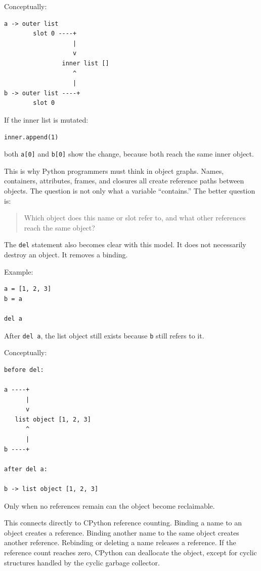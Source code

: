 Conceptually:

\begin{verbatim}
a -> outer list
        slot 0 ----+
                   |
                   v
                inner list []
                   ^
                   |
b -> outer list ----+
        slot 0
\end{verbatim}

If the inner list is mutated:

\begin{verbatim}
inner.append(1)
\end{verbatim}

both \texttt{a[0]} and \texttt{b[0]} show the change, because both reach the same inner object.

This is why Python programmers must think in object graphs. Names, containers, attributes, frames, and closures all create reference paths between objects. The question is not only what a variable ``contains.'' The better question is:

\begin{quote}
Which object does this name or slot refer to, and what other references reach the same object?
\end{quote}

The \texttt{del} statement also becomes clear with this model. It does not necessarily destroy an object. It removes a binding.

Example:

\begin{verbatim}
a = [1, 2, 3]
b = a

del a
\end{verbatim}

After \texttt{del a}, the list object still exists because \texttt{b} still refers to it.

Conceptually:

\begin{verbatim}
before del:

a ----+
      |
      v
   list object [1, 2, 3]
      ^
      |
b ----+

after del a:

b -> list object [1, 2, 3]
\end{verbatim}

Only when no references remain can the object become reclaimable.

This connects directly to CPython reference counting. Binding a name to an object creates a reference. Binding another name to the same object creates another reference. Rebinding or deleting a name releases a reference. If the reference count reaches zero, CPython can deallocate the object, except for cyclic structures handled by the cyclic garbage collector.

